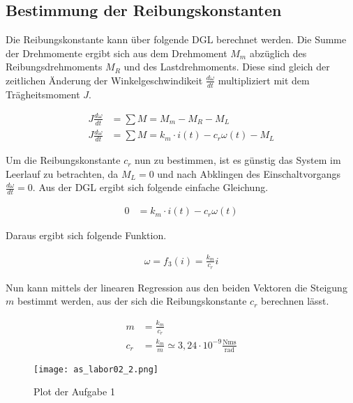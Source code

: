 \subsection{Bestimmung der Reibungskonstanten}

Die Reibungskonstante kann über folgende DGL berechnet werden.
Die Summe der Drehmomente ergibt sich aus dem Drehmoment $M_m$
abzüglich des Reibungsdrehmoments $M_R$ und des Lastdrehmoments.
Diese sind gleich der zeitlichen Änderung der Winkelgeschwindikeit 
$\frac{d \omega}{dt}$ multipliziert mit dem Trägheitsmoment $J$.

\begin{equation} \label{eq221}
    \begin{split}
        J \frac{d \omega}{d t} &= \sum M = M_m - M_R - M_L \\
        J \frac{d \omega}{d t} &= \sum M = k_m \cdot i(t) - c_r \omega (t) - M_L 
    \end{split}
\end{equation}

Um die Reibungskonstante $c_r$ nun zu bestimmen, ist es günstig das
System im Leerlauf zu betrachten, da $M_L=0$ und nach Abklingen des
Einschaltvorgangs $\frac{d\omega}{dt} =0$. Aus der DGL ergibt sich
folgende einfache Gleichung.

\begin{equation} \label{eq222}
    \begin{split}
        0 & = k_m \cdot i(t) - c_r \omega (t)
    \end{split}
\end{equation}

Daraus ergibt sich folgende Funktion.

\begin{equation} \label{eq222}
    \begin{split}
        \omega = f_3(i) = \frac{k_m}{c_r} i
    \end{split}
\end{equation}

Nun kann mittels der linearen Regression aus den beiden Vektoren die Steigung
$m$ bestimmt werden, aus der sich die Reibungskonstante $c_r$ berechnen lässt.

\begin{equation} \label{eq218}
    \begin{split}
       m &=  \frac{k_m}{c_r}\\
       c_r &= \frac{k_m}{m} \simeq 3,24 \cdot 10^{-9} \mathrm{\frac{Nm s}{rad}}
    \end{split}
\end{equation}

\begin{figure}[H]
 \centering
    \texttt{[image: as\_labor02\_2.png]}
 \caption{Plot der Aufgabe 1}
 \label{fig:PlotAufgabe1}
\end{figure}